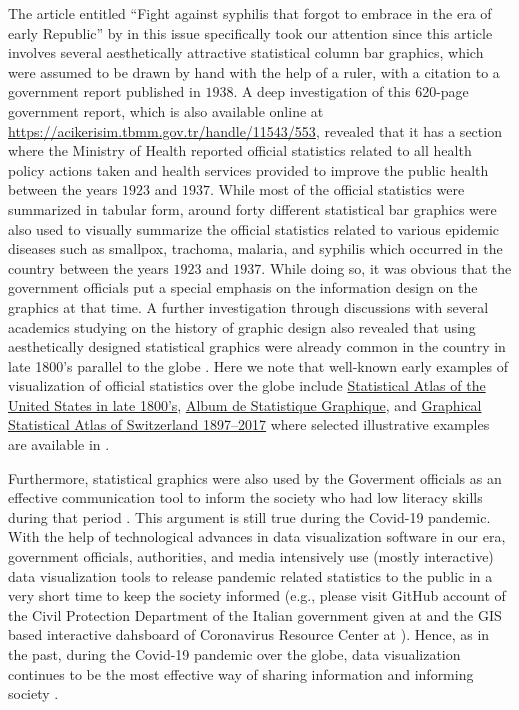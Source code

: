 The article entitled \enquote{Fight against syphilis that forgot to embrace in the era of early Republic} by \cite{Malkoc} in this issue specifically took our attention since this article involves several aesthetically attractive statistical column bar graphics, which were assumed to be drawn by hand with the help of a ruler, with a citation to a government report published in $1938$. 
A deep investigation of this 620-page government report, which is also available online at \url{https://acikerisim.tbmm.gov.tr/handle/11543/553}, revealed that it has a section where the Ministry of Health reported official statistics related to all health policy actions taken and health  services provided to improve the public health between the years $1923$ and $1937$. While  most of the official statistics were summarized in tabular form, around forty different statistical bar graphics were also used to visually summarize the official statistics related to various epidemic diseases such as smallpox, trachoma, malaria, and syphilis which occurred in the country between the years $1923$ and $1937$. While doing so, it was obvious that the government officials  put a special emphasis on the information design on the graphics at that time. A further investigation through discussions with  several academics studying on the history of graphic design also revealed that using aesthetically designed statistical graphics  were already common in the country in late 1800's parallel to the globe  \citep{Durmaz}. Here we note that well-known early examples of visualization of official statistics over the globe 
include  \href{https://www.census.gov/history/www/programs/geography/statistical\ _atlases.html}{Statistical Atlas of the United States in late 1800's},  \href{https://gallica.bnf.fr/ark:/12148/bpt6k990638x.r=}{Album de Statistique Graphique}, and \href{https://www.bfs.admin.ch/bfs/en/home/statistics/regional-statistics/atlases/graphical-statistical-atlas-switzerland-1897-2017.html}
{Graphical Statistical Atlas of Switzerland 1897–2017} where selected illustrative examples are available in  \citet{friendly2008golden}.

Furthermore, statistical graphics were also used by the Goverment officials as an effective communication tool to inform the society who had low literacy skills during that period \citep{BS}. This argument is still true during the Covid-19 pandemic. With the help of technological advances in data visualization software in our era, government officials, authorities,  and media intensively use (mostly interactive) data visualization tools to release pandemic related statistics to the public in a very short time to keep the society informed  (e.g., please visit GitHub account of the Civil Protection Department of the Italian government given at \cite{IG} and the GIS based interactive dahsboard of Coronavirus Resource Center at \cite{JS}). Hence, as in the past, during the Covid-19 pandemic over the globe, data visualization continues to be the most effective way of sharing information and informing society \citep{Mccoy}.


